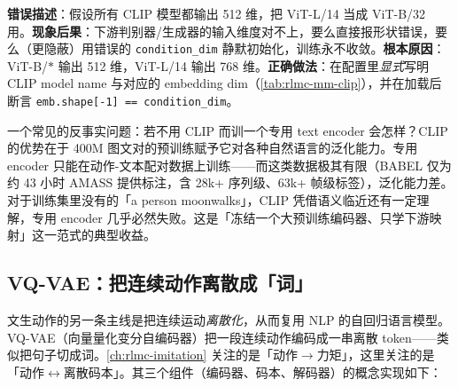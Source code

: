 \begin{pitfall}
\textbf{错误描述}：假设所有 CLIP 模型都输出 512 维，把 ViT-L/14 当成 ViT-B/32 用。\textbf{现象后果}：下游判别器/生成器的输入维度对不上，要么直接报形状错误，要么（更隐蔽）用错误的 \verb|condition_dim| 静默初始化，训练永不收敛。\textbf{根本原因}：ViT-B/$\ast$ 输出 512 维，ViT-L/14 输出 768 维。\textbf{正确做法}：在配置里\emph{显式}写明 CLIP model name 与对应的 embedding dim（\cref{tab:rlmc-mm-clip}），并在加载后断言 \verb|emb.shape[-1] == condition_dim|。
\end{pitfall}

\begin{insight}\label{ins:rlmc-mm-whyclip}
一个常见的反事实问题：若不用 CLIP 而训一个专用 text encoder 会怎样？CLIP 的优势在于 400M 图文对的预训练赋予它对各种自然语言的泛化能力。专用 encoder 只能在动作-文本配对数据上训练——而这类数据极其有限（BABEL 仅为约 43 小时 AMASS 提供标注，含 28k+ 序列级、63k+ 帧级标签），泛化能力差。对于训练集里没有的「a person moonwalks」，CLIP 凭借语义临近还有一定理解，专用 encoder 几乎必然失败。这是「冻结一个大预训练编码器、只学下游映射」这一范式的典型收益。
\end{insight}

\subsection{VQ-VAE：把连续动作离散成「词」}
\label{sec:rlmc-mm-vqvae}

文生动作的另一条主线是把连续运动\emph{离散化}，从而复用 NLP 的自回归语言模型。VQ-VAE（向量量化变分自编码器）把一段连续动作编码成一串离散 token——类似把句子切成词。\cref{ch:rlmc-imitation} 关注的是「动作$\to$力矩」，这里关注的是「动作$\leftrightarrow$离散码本」。其三个组件（编码器、码本、解码器）的概念实现如下：

